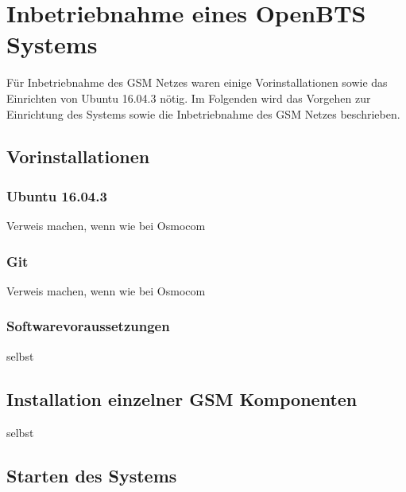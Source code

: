 
\section{Inbetriebnahme eines OpenBTS Systems}
Für Inbetriebnahme des GSM Netzes waren einige Vorinstallationen sowie das Einrichten von Ubuntu 16.04.3 nötig. Im Folgenden wird das Vorgehen zur Einrichtung des Systems sowie die Inbetriebnahme des GSM Netzes beschrieben.

\subsection{Vorinstallationen}

\subsubsection{Ubuntu 16.04.3}

Verweis machen, wenn wie bei Osmocom

\subsubsection{Git}

Verweis machen, wenn wie bei Osmocom

\subsubsection{Softwarevoraussetzungen}

selbst

\subsection{Installation einzelner GSM Komponenten}\label{GSM_Komp}

selbst 

\subsection{Starten des Systems}
